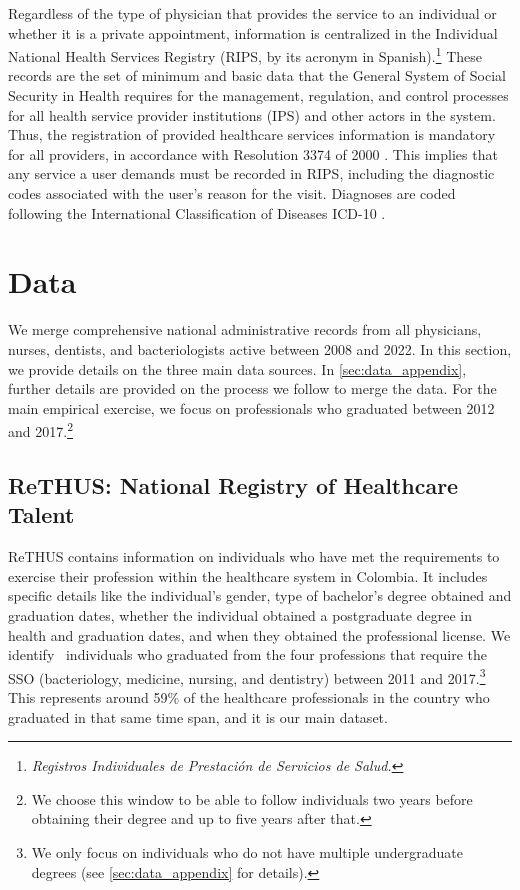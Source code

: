 \documentclass[12pt, a4paper]{article}
\begin{document}
Regardless of the type of physician that provides the service to an individual or whether it is a private appointment, information is centralized in the Individual National Health Services Registry (RIPS, by its acronym in Spanish).\footnote{\textit{Registros Individuales de Prestación de Servicios de Salud.}} These records are the set of minimum and basic data that the General System of Social Security in Health requires for the management, regulation, and control processes for all health service provider institutions (IPS) and other actors in the system. Thus, the registration of provided healthcare services information is mandatory for all providers, in accordance with Resolution 3374 of 2000 \citep{RIPS}. This implies that any service a user demands must be recorded in RIPS, including the diagnostic codes associated with the user's reason for the visit. Diagnoses are coded following the International Classification of Diseases ICD-10 \citep{RIPS}.


\section{Data} \label{sec:data}

We merge comprehensive national administrative records from all physicians, nurses, dentists, and bacteriologists active between 2008 and 2022. In this section, we provide details on the three main data sources. In \autoref{sec:data_appendix}, further details are provided on the process we follow to merge the data. For the main empirical exercise, we focus on professionals who graduated between 2012 and 2017.\footnote{We choose this window to be able to follow individuals two years before obtaining their degree and up to five years after that.} 


\subsection{ReTHUS: National Registry of Healthcare Talent}


 ReTHUS contains information on individuals who have met the requirements to exercise their profession within the healthcare system in Colombia. It includes specific details like the individual's gender, type of bachelor's degree obtained and graduation dates, whether the individual obtained a postgraduate degree in health and graduation dates, and when they obtained the professional license. We identify \samplerethus\ individuals who graduated from the four professions that require the SSO (bacteriology, medicine, nursing, and dentistry) between 2011 and 2017.\footnote{We only focus on individuals who do not have multiple undergraduate degrees (see \autoref{sec:data_appendix} for details).} This represents around 59\% of the healthcare professionals in the country who graduated in that same time span, and it is our main dataset.
\end{document}
